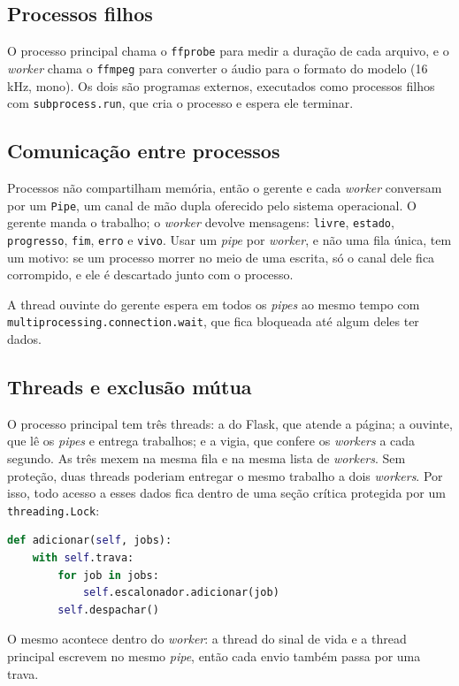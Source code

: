 \documentclass[12pt,a4paper]{article}
\begin{document}
\subsection{Processos filhos}
O processo principal chama o \texttt{ffprobe} para medir a duração de cada arquivo, e o
\emph{worker} chama o \texttt{ffmpeg} para converter o áudio para o formato do modelo (16 kHz,
mono). Os dois são programas externos, executados como processos filhos com
\texttt{subprocess.run}, que cria o processo e espera ele terminar.

\subsection{Comunicação entre processos}
Processos não compartilham memória, então o gerente e cada \emph{worker} conversam por um
\texttt{Pipe}, um canal de mão dupla oferecido pelo sistema operacional. O gerente manda o
trabalho; o \emph{worker} devolve mensagens: \texttt{livre}, \texttt{estado},
\texttt{progresso}, \texttt{fim}, \texttt{erro} e \texttt{vivo}. Usar um \emph{pipe} por
\emph{worker}, e não uma fila única, tem um motivo: se um processo morrer no meio de uma
escrita, só o canal dele fica corrompido, e ele é descartado junto com o processo.

A thread ouvinte do gerente espera em todos os \emph{pipes} ao mesmo tempo com
\texttt{multiprocessing.connection.wait}, que fica bloqueada até algum deles ter dados.

\subsection{Threads e exclusão mútua}
O processo principal tem três threads: a do Flask, que atende a página; a ouvinte, que lê os
\emph{pipes} e entrega trabalhos; e a vigia, que confere os \emph{workers} a cada segundo. As
três mexem na mesma fila e na mesma lista de \emph{workers}. Sem proteção, duas threads
poderiam entregar o mesmo trabalho a dois \emph{workers}. Por isso, todo acesso a esses dados
fica dentro de uma seção crítica protegida por um \texttt{threading.Lock}:

\begin{lstlisting}[language=Python]
def adicionar(self, jobs):
    with self.trava:
        for job in jobs:
            self.escalonador.adicionar(job)
        self.despachar()
\end{lstlisting}

O mesmo acontece dentro do \emph{worker}: a thread do sinal de vida e a thread principal
escrevem no mesmo \emph{pipe}, então cada envio também passa por uma trava.
\end{document}
